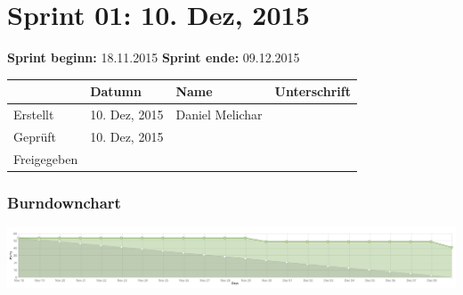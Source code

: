 \chapter{Sprint 01: 10. Dez, 2015}

\textbf{Sprint beginn:} 18.11.2015
\textbf{Sprint ende:} 09.12.2015

\begin{tabular}{|l|l|l|l|l|l|}
            & Datumn        & Name            & \multicolumn{3}{l}{Unterschrift} \\ \hline
Erstellt    & 10. Dez, 2015 & Daniel Melichar & \multicolumn{3}{l}{}             \\ \hline
Geprüft     & 10. Dez, 2015 &                 & \multicolumn{3}{l}{}             \\ \hline
Freigegeben &               &                 & \multicolumn{3}{l}{}            
\end{tabular}

\subsection{Burndownchart}
\includegraphics[scale=0.2, ]{images/sprint01-burndown.png}

